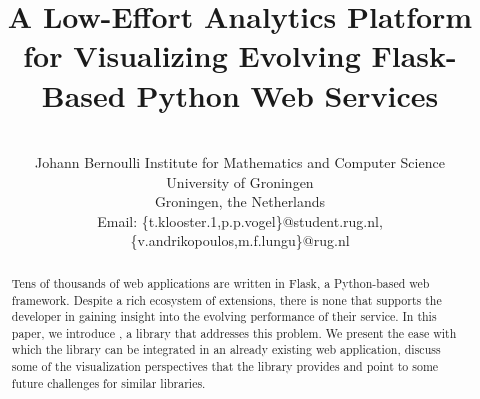 \documentclass[conference]{IEEEtran}
\begin{document}
%
\title{A Low-Effort Analytics Platform for Visualizing Evolving Flask-Based Python Web Services}



\author{
\\
Johann Bernoulli Institute for Mathematics and Computer Science\\
University of Groningen\\
Groningen, the Netherlands\\
Email: \{t.klooster.1,p.p.vogel\}@student.rug.nl, \{v.andrikopoulos,m.f.lungu\}@rug.nl 
}

\maketitle

\begin{abstract}

  Tens of thousands of web applications are written in Flask, a Python-based web framework. Despite a rich ecosystem of extensions, there is none that supports the developer in gaining insight into the evolving performance of their service. In this paper, we introduce \tool, a library that addresses this problem. We present the ease with which the library can be integrated in an already existing web application, discuss some of the visualization perspectives that the library provides and point to some future challenges for similar libraries.

\end{abstract}
\end{document}

